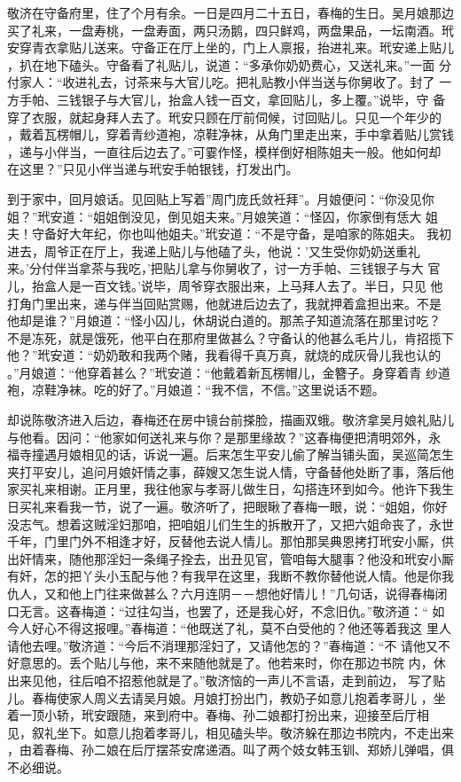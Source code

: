 敬济在守备府里，住了个月有余。一日是四月二十五日，春梅的生日。吴月娘那边
买了礼来，一盘寿桃，一盘寿面，两只汤鹅，四只鲜鸡，两盘果品，一坛南酒。玳
安穿青衣拿贴儿送来。守备正在厅上坐的，门上人禀报，抬进礼来。玳安递上贴儿
，扒在地下磕头。守备看了礼贴儿，说道：“多承你奶奶费心，又送礼来。”一面
分付家人：“收进礼去，讨茶来与大官儿吃。把礼贴教小伴当送与你舅收了。封了
一方手帕、三钱银子与大官儿，抬盒人钱一百文，拿回贴儿，多上覆。”说毕，守
备穿了衣服，就起身拜人去了。玳安只顾在厅前伺候，讨回贴儿。只见一个年少的
，戴着瓦楞帽儿，穿着青纱道袍，凉鞋净袜，从角门里走出来，手中拿着贴儿赏钱
，递与小伴当，一直往后边去了。”可霎作怪，模样倒好相陈姐夫一般。他如何却
在这里？”只见小伴当递与玳安手帕银钱，打发出门。

到于家中，回月娘话。见回贴上写着”周门庞氏敛衽拜”。月娘便问：“你没见你
姐？”玳安道：“姐姐倒没见，倒见姐夫来。”月娘笑道：“怪囚，你家倒有恁大
姐夫！守备好大年纪，你也叫他姐夫。”玳安道：“不是守备，是咱家的陈姐夫。
我初进去，周爷正在厅上，我递上贴儿与他磕了头，他说：'又生受你奶奶送重礼
来。'分付伴当拿茶与我吃，'把贴儿拿与你舅收了，讨一方手帕、三钱银子与大
官儿，抬盒人是一百文钱。'说毕，周爷穿衣服出来，上马拜人去了。半日，只见
他打角门里出来，递与伴当回贴赏赐，他就进后边去了，我就押着盒担出来。不是
他却是谁？”月娘道：“怪小囚儿，休胡说白道的。那羔子知道流落在那里讨吃？
不是冻死，就是饿死，他平白在那府里做甚么？守备认的他甚么毛片儿，肯招揽下
他？”玳安道：“奶奶敢和我两个赌，我看得千真万真，就烧的成灰骨儿我也认的
。”月娘道：“他穿着甚么？”玳安道：“他戴着新瓦楞帽儿，金簪子。身穿着青
纱道袍，凉鞋净袜。吃的好了。”月娘道：“我不信，不信。”这里说话不题。

却说陈敬济进入后边，春梅还在房中镜台前搽脸，描画双蛾。敬济拿吴月娘礼贴儿
与他看。因问：“他家如何送礼来与你？是那里缘故？”这春梅便把清明郊外，永
福寺撞遇月娘相见的话，诉说一遍。后来怎生平安儿偷了解当铺头面，吴巡简怎生
夹打平安儿，追问月娘奸情之事，薛嫂又怎生说人情，守备替他处断了事，落后他
家买礼来相谢。正月里，我往他家与孝哥儿做生日，勾搭连环到如今。他许下我生
日买礼来看我一节，说了一遍。敬济听了，把眼瞅了春梅一眼，说：“姐姐，你好
没志气。想着这贼淫妇那咱，把咱姐儿们生生的拆散开了，又把六姐命丧了，永世
千年，门里门外不相逢才好，反替他去说人情儿。那怕那吴典恩拷打玳安小厮，供
出奸情来，随他那淫妇一条绳子拴去，出丑见官，管咱每大腿事？他没和玳安小厮
有奸，怎的把丫头小玉配与他？有我早在这里，我断不教你替他说人情。他是你我
仇人，又和他上门往来做甚么？六月连阴－－想他好情儿！”几句话，说得春梅闭
口无言。这春梅道：“过往勾当，也罢了，还是我心好，不念旧仇。”敬济道：“
如今人好心不得这报哩。”春梅道：“他既送了礼，莫不白受他的？他还等着我这
里人请他去哩。”敬济道：“今后不消理那淫妇了，又请他怎的？”春梅道：“不
请他又不好意思的。丢个贴儿与他，来不来随他就是了。他若来时，你在那边书院
内，休出来见他，往后咱不招惹他就是了。”敬济恼的一声儿不言语，走到前边，
写了贴儿。春梅使家人周义去请吴月娘。月娘打扮出门，教奶子如意儿抱着孝哥儿
，坐着一顶小轿，玳安跟随，来到府中。春梅、孙二娘都打扮出来，迎接至后厅相
见，叙礼坐下。如意儿抱着孝哥儿，相见磕头毕。敬济躲在那边书院内，不走出来
，由着春梅、孙二娘在后厅摆茶安席递酒。叫了两个妓女韩玉钏、郑娇儿弹唱，俱
不必细说。

